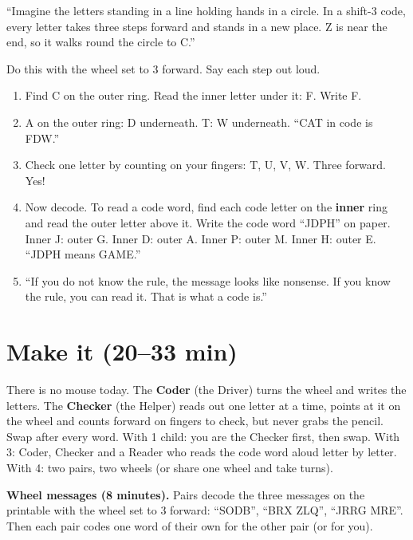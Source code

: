 \begin{analogy}
\enquote{Imagine the letters standing in a line holding hands in a circle. In a shift-3 code, every letter takes three steps forward and stands in a new place. Z is near the end, so it walks round the circle to C.}
\end{analogy}

\begin{workedexample}
Do this with the wheel set to 3 forward. Say each step out loud.
\begin{enumerate}[leftmargin=1.4em,itemsep=1pt]
  \item Find C on the outer ring. Read the inner letter under it: F. Write F.
  \item A on the outer ring: D underneath. T: W underneath. \enquote{CAT in code is FDW.}
  \item Check one letter by counting on your fingers: T, U, V, W. Three forward. Yes!
  \item Now decode. To read a code word, find each code letter on the \textbf{inner} ring and read the outer letter above it. Write the code word \enquote{JDPH} on paper. Inner J: outer G. Inner D: outer A. Inner P: outer M. Inner H: outer E. \enquote{JDPH means GAME.}
  \item \enquote{If you do not know the rule, the message looks like nonsense. If you know the rule, you can read it. That is what a code is.}
\end{enumerate}
\end{workedexample}

\section{Make it (20--33 min)}
\begin{pairroles}
There is no mouse today. The \textbf{Coder} (the Driver) turns the wheel and writes the letters. The \textbf{Checker} (the Helper) reads out one letter at a time, points at it on the wheel and counts forward on fingers to check, but never grabs the pencil. Swap after every word. With 1 child: you are the Checker first, then swap. With 3: Coder, Checker and a Reader who reads the code word aloud letter by letter. With 4: two pairs, two wheels (or share one wheel and take turns).
\end{pairroles}

\textbf{Wheel messages (8 minutes).} Pairs decode the three messages on the printable with the wheel set to 3 forward: \enquote{SODB}, \enquote{BRX ZLQ}, \enquote{JRRG MRE}. Then each pair codes one word of their own for the other pair (or for you).

